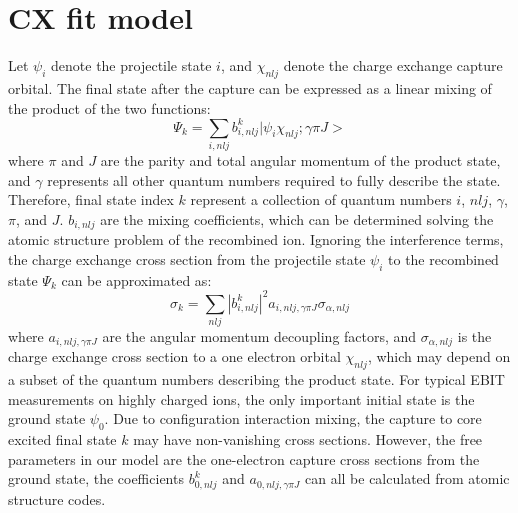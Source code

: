 \documentclass{aastex}
\begin{document}
\section{CX fit model}
Let $\psi_i$ denote the projectile state $i$, and $\chi_{nlj}$ denote the
charge exchange capture orbital. The final state after the capture can be
expressed as a linear mixing of the product of the two functions:
\begin{equation}
  \Psi_k = \sum_{i,nlj}b^k_{i,nlj}|\psi_i\chi_{nlj};\gamma\pi J>
\end{equation}
where $\pi$ and $J$ are the parity and total angular momentum of the product
state, and $\gamma$ represents all other quantum numbers required to fully
describe the state. Therefore, final state index $k$ represent a collection of
quantum numbers $i$, $nlj$, $\gamma$, $\pi$, and $J$. $b_{i,nlj}$ are the
mixing coefficients, which can be 
determined solving the atomic structure problem of the recombined
ion. Ignoring the interference terms, the charge exchange cross section from
the projectile state $\psi_i$ to the recombined state $\Psi_k$ can be
approximated as:
\begin{equation}
  \sigma_k = \sum_{nlj}|b^k_{i,nlj}|^2a_{i,nlj,\gamma\pi J}\sigma_{\alpha,nlj}
\end{equation}
where $a_{i,nlj,\gamma\pi J}$ are the angular momentum decoupling factors, and
$\sigma_{\alpha,nlj}$ is the charge exchange cross section to a one electron
orbital $\chi_{nlj}$, which may depend on a subset of the quantum numbers
describing the product state. For typical EBIT measurements on highly charged
ions, the only important initial state is the ground state $\psi_0$. Due to
configuration interaction mixing, the capture to core excited final state $k$
may have non-vanishing cross sections. However, the free parameters in our
model are the one-electron capture cross sections from the ground state, the
coefficients $b^k_{0,nlj}$ and $a_{0,nlj,\gamma\pi J}$ can all be calculated
from atomic structure codes.
\end{document}
